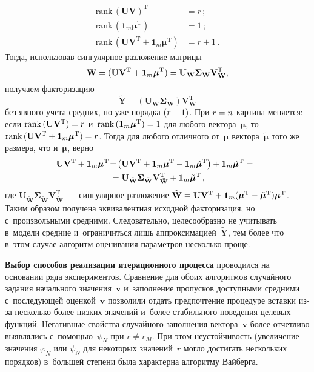 \begin{multicols}{2}
\noindent
\begin{align*}
\mathrm{rank}\,(\mathbf{U}\mathbf{V})^{\mathrm{T}}&=r\,;\\
\mathrm{rank}\,(\mathbf{1}_m\bm{\mu}^{\mathrm{T}})&=1\,;\\ 
\mathrm{rank}\,(\mathbf{U}\mathbf{V}^{\mathrm{T}}+\mathbf{1}_m\bm{\mu}^{\mathrm{T}})&= r+1\,. 
\end{align*}
Тогда, использовав сингулярное разложение мат\-рицы
$$
\mathbf{W}= 
(\mathbf{U}\mathbf{V}^{\mathrm{T}}\hm+ \mathbf{1}_m\bm{\mu}^{\mathrm{T}})\hm= 
\mathbf{U}_{\mathbf{W}} \bm{\Sigma}_{\mathbf{W}} 
\mathbf{V}^{\mathrm{T}}_{\mathbf{W}},
$$
 получаем факторизацию 
 $$
 \tilde{\mathbf{Y}} = \left(\mathbf{U}_{\mathbf{W}} 
\bm{\Sigma}_{\mathbf{W}}\right)\mathbf{V}^{\mathrm{T}}_{\mathbf{W}}
$$ 
без явного учета 
средних, но уже порядка $(r\hm+1)$. При $r\hm=n$ картина меняется: если 
$\mathrm{rank}\,(\mathbf{U}\mathbf{V}^{\mathrm{T}})\hm=r$ и~$\mathrm{rank}\,(\mathbf{1}_m\bm{\mu}^{\mathrm{T}})\hm=1$ для любого вектора~$\bm{\mu}$, то 
$\mathrm{rank}\,(\mathbf{U}\mathbf{V}^{\mathrm{T}}\hm+ \mathbf{1}_m\bm{\mu}^{\mathrm{T}})\hm=r$. Тогда 
для любого отличного от~$\bm{\mu}$ вектора~$\tilde{\bm{\mu}}$ того же 
размера, что и~$\bm{\mu}$, верно
     \begin{multline*}
     \!\!\!\mathbf{U}\mathbf{V}^{\mathrm{T}} +\mathbf{1}_m\bm{\mu}^{\mathrm{T}}\! = \!
\left(\mathbf{U}\mathbf{V}^{\mathrm{T}} +\mathbf{1}_m\bm{\mu}^{\mathrm{T}} -
\mathbf{1}_m\tilde{\bm{\mu}}^{\mathrm{T}}\right) +\mathbf{1}_m\tilde{\bm{\mu}}^{\mathrm{T}} 
={}\hspace*{-0.67305pt}\\
{}=\mathbf{U}_{\tilde{\mathbf{W}}} \bm{\Sigma}_{\tilde{\mathbf{W}}}
\mathbf{V}^{\mathrm{T}}_{\tilde{\mathbf{W}}} +\mathbf{1}_m \tilde{\bm{\mu}}^{\mathrm{T}}\,,
   \end{multline*}
где $\mathbf{U}_{\tilde{\mathbf{W}}} \bm{\Sigma}_{\tilde{\mathbf{W}}} \mathbf{V}^{\mathrm{T}}_{\tilde{\mathbf{W}}}$~--- сингулярное разложение 
$\tilde{\mathbf{W}} \hm= \mathbf{U}\mathbf{V}^{\mathrm{T}}\hm+\mathbf{1}_m 
(\bm{\mu}^{\mathrm{T}}-\tilde{\bm{\mu}}^{\mathrm{T}})\bm{\mu}^{\mathrm{T}}$. Таким образом получена 
эквивалентная исходной факторизация, но с~произвольными средними. 
Следовательно, целесообразно не учитывать в~модели средние и~ограничиться 
лишь аппроксимацией~$\tilde{\mathbf{Y}}$, тем более что в~этом случае 
алгоритм оценивания параметров несколько проще.
     
     \textbf{Выбор способов реализации итерационного процесса} 
проводился на основании ряда экспериментов. Сравнение для обоих 
алгоритмов случайного задания начального значения~$\bm{v}$ и~заполнение 
пропусков доступными средними с~последующей оценкой~$\bm{v}$ позволили 
отдать предпочтение процедуре вставки из-за несколько более низких значений 
и~более стабильного поведения целевых функций. Негативные свойства 
случайного заполнения вектора~$\bm{v}$ более отчетливо выявлялись 
с~помощью~$\psi_N$ при $r\not= r_M$. При этом неустойчивость (увеличение 
значения $\varphi_N$ или $\psi_N$ для некоторых значений~$r$ могло 
достигать нескольких порядков) в~большей степени была характерна алгоритму 
Вайберга. 


\end{multicols}
